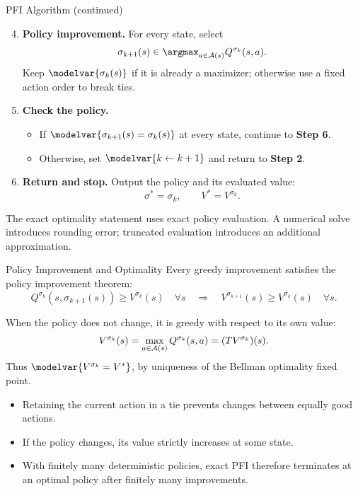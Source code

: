 \begin{frame}{PFI Algorithm (continued)}
\small
\begin{enumerate}
\setcounter{enumi}{3}
\item \textbf{Policy improvement.} For every state, select
\[\sigma_{k+1}(s)\in\argmax_{a\in\Aset(s)}Q^{\sigma_k}(s,a).\]
Keep \(\modelvar{\sigma_k(s)}\) if it is already a maximizer; otherwise use a fixed action order to break ties.
\item \textbf{Check the policy.}
\begin{itemize}
\item If \(\modelvar{\sigma_{k+1}(s)=\sigma_k(s)}\) at every state, continue to \textbf{Step 6}.
\item Otherwise, set \(\modelvar{k\leftarrow k+1}\) and return to \textbf{Step 2}.
\end{itemize}
\item \textbf{Return and stop.} Output the policy and its evaluated value:
\[\sigma^*=\sigma_k,\qquad V^*=V^{\sigma_k}.\]
\end{enumerate}
\par\smallskip
\footnotesize The exact optimality statement uses exact policy evaluation. A numerical solve introduces rounding error; truncated evaluation introduces an additional approximation.
\end{frame}

\begin{frame}{Policy Improvement and Optimality}
\small
Every greedy improvement satisfies the policy improvement theorem:
\[
Q^{\sigma_k}(s,\sigma_{k+1}(s))\geq V^{\sigma_k}(s)\quad\forall s
\quad\Longrightarrow\quad
V^{\sigma_{k+1}}(s)\geq V^{\sigma_k}(s)\quad\forall s.
\]
\par\smallskip
When the policy does not change, it is greedy with respect to its own value:
\[
V^{\sigma_k}(s)=\max_{a\in\mathcal A(s)}Q^{\sigma_k}(s,a)
=(TV^{\sigma_k})(s).
\]
Thus \(\modelvar{V^{\sigma_k}=V^*}\), by uniqueness of the Bellman optimality fixed point.
\par\medskip
\begin{itemize}
\item Retaining the current action in a tie prevents changes between equally good actions.
\item If the policy changes, its value strictly increases at some state.
\item With finitely many deterministic policies, exact PFI therefore terminates at an optimal policy after finitely many improvements.
\end{itemize}
\end{frame}

